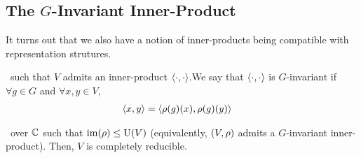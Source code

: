 \subsection{The $G$-Invariant Inner-Product}

It turns out that we also have a notion of inner-products being compatible with representation strutures.

\begin{boxdefinition}
    \ such that $V$ admits an inner-product $\left\langle \cdot, \cdot \right\rangle$.We say that $\left\langle \cdot, \cdot \right\rangle$ is $G$-invariant if $\forall g \in G$ and $\forall x, y \in V$,
    \begin{align*}
        \left\langle x,y \right\rangle &= \left\langle \rho(g)(x), \rho(g)(y) \right\rangle
    \end{align*}
\end{boxdefinition}

\begin{proposition}
    \ over $\mathbb{C}$ such that $\operatorname{im}\!\left( \rho \right) \leq \operatorname{U}\!\left( V \right)$ (equivalently, $\left( V, \rho \right)$ admits a $G$-invariant inner-product). Then, $V$ is completely reducible. %
\end{proposition}